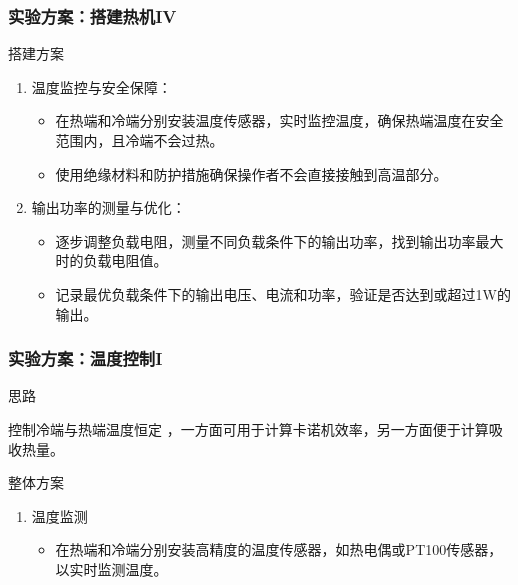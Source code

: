 \documentclass[aspectratio=169]{beamer}
\newcounter{currentenumi}
\begin{document}
	\begin{frame}	
		\frametitle{实验方案：搭建热机IV}	
		
		\begin{block}{搭建方案}
			\begin{enumerate}
				
				\setcounter{enumi}{\thecurrentenumi}			
				
				\item 温度监控与安全保障：
				\begin{itemize}
					\item 在热端和冷端分别安装温度传感器，实时监控温度，确保热端温度在安全范围内，且冷端不会过热。
					\item 使用绝缘材料和防护措施确保操作者不会直接接触到高温部分。
				\end{itemize}
				
				\item 输出功率的测量与优化：
				\begin{itemize}
					\item 逐步调整负载电阻，测量不同负载条件下的输出功率，找到输出功率最大时的负载电阻值。
					\item 记录最优负载条件下的输出电压、电流和功率，验证是否达到或超过1W的输出。
				\end{itemize}
			\end{enumerate}
		\end{block}
		
	\end{frame}
	
	\begin{frame}
		\frametitle{实验方案：温度控制I}
		
		\begin{block}{思路}
			\begin{myhighlight}
				控制冷端与热端温度恒定 ，一方面可用于计算卡诺机效率，另一方面便于计算吸收热量。
			\end{myhighlight}
		\end{block}
		
		\begin{block}{整体方案}
			\begin{enumerate}
				\item 温度监测
				\begin{itemize}
					\item 在热端和冷端分别安装高精度的温度传感器，如热电偶或PT100传感器，以实时监测温度。
				\end{itemize}
				
				\setcounter{currentenumi}{\theenumi}
				
			\end{enumerate}
		\end{block}
	\end{frame}
	
\end{document}
